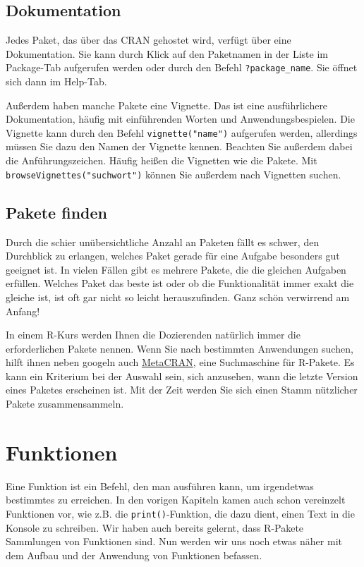 \documentclass[
]{book}
\begin{document}
\hypertarget{dokumentation}{%
\subsection{Dokumentation}\label{dokumentation}}

Jedes Paket, das über das CRAN gehostet wird, verfügt über eine Dokumentation. Sie kann durch Klick auf den Paketnamen in der Liste im Package-Tab aufgerufen werden oder durch den Befehl \texttt{?package\_name}. Sie öffnet sich dann im Help-Tab.

Außerdem haben manche Pakete eine Vignette. Das ist eine ausführlichere Dokumentation, häufig mit einführenden Worten und Anwendungsbespielen. Die Vignette kann durch den Befehl \texttt{vignette("name")} aufgerufen werden, allerdings müssen Sie dazu den Namen der Vignette kennen. Beachten Sie außerdem dabei die Anführungszeichen. Häufig heißen die Vignetten wie die Pakete. Mit \texttt{browseVignettes("suchwort")} können Sie außerdem nach Vignetten suchen.

\hypertarget{pakete-finden}{%
\subsection{Pakete finden}\label{pakete-finden}}

Durch die schier unübersichtliche Anzahl an Paketen fällt es schwer, den Durchblick zu erlangen, welches Paket gerade für eine Aufgabe besonders gut geeignet ist. In vielen Fällen gibt es mehrere Pakete, die die gleichen Aufgaben erfüllen. Welches Paket das beste ist oder ob die Funktionalität immer exakt die gleiche ist, ist oft gar nicht so leicht herauszufinden. Ganz schön verwirrend am Anfang!

In einem R-Kurs werden Ihnen die Dozierenden natürlich immer die erforderlichen Pakete nennen. Wenn Sie nach bestimmten Anwendungen suchen, hilft ihnen neben googeln auch \href{https://www.r-pkg.org/}{MetaCRAN}, eine Suchmaschine für R-Pakete. Es kann ein Kriterium bei der Auswahl sein, sich anzusehen, wann die letzte Version eines Paketes erscheinen ist. Mit der Zeit werden Sie sich einen Stamm nützlicher Pakete zusammensammeln.

\hypertarget{funktionen}{%
\section{Funktionen}\label{funktionen}}

Eine Funktion ist ein Befehl, den man ausführen kann, um irgendetwas bestimmtes zu erreichen. In den vorigen Kapiteln kamen auch schon vereinzelt Funktionen vor, wie z.B. die \texttt{print()}-Funktion, die dazu dient, einen Text in die Konsole zu schreiben. Wir haben auch bereits gelernt, dass R-Pakete Sammlungen von Funktionen sind. Nun werden wir uns noch etwas näher mit dem Aufbau und der Anwendung von Funktionen befassen.
\end{document}
